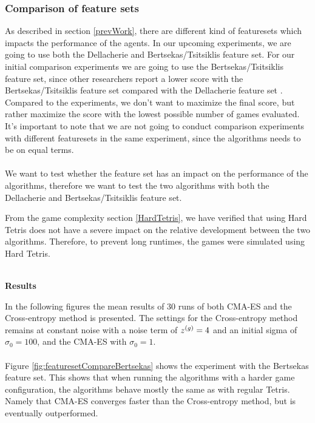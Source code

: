 \subsubsection{Comparison of feature sets  \label{compoffeatureset}}
As described in section \ref{prevWork}, there are different kind of featuresets which
impacts the performance of the agents. In our upcoming experiments, we are going to
use both the Dellacherie and Bertsekas/Tsitsiklis feature set. For our initial comparison experiments
we are going to use the Bertsekas/Tsitsiklis feature set, since other researchers report
a lower score with the Bertsekas/Tsitsiklis feature set compared with the Dellacherie feature set
\citep{thiery:09}. Compared to the \citep{thiery:09} experiments, we don't want to maximize the
final score, but rather maximize the score with the lowest possible number of 
games evaluated.\\
It's important to note that we are not going to conduct comparison experiments with different
featuresets in the same experiment, since the algorithms needs to be on equal terms.\\
\\
We want to test whether the feature set has an impact on the performance of the algorithms,
therefore we want to test the two algorithms with both the Dellacherie and Bertsekas/Tsitsiklis feature set.\\
\begin{changebar}
From the game complexity section \ref{HardTetris}, we have verified that using Hard Tetris
\citep{boumaza2009} does not have a severe impact on the relative 
development between the two algorithms.
Therefore, to prevent long runtimes, the games were simulated
using Hard Tetris.
\end{changebar}\\

\textbf{Results}

In the following figures the mean results of 30 runs of both CMA-ES and the Cross-entropy method is presented. The settings for the Cross-entropy method remains at constant noise
with a noise term of $z^{(g)} = 4$ and an initial sigma of $\sigma_0 = 100$, 
and the CMA-ES with $\sigma_0 = 1$.\\
\\
Figure \ref{fig:featuresetCompareBertsekas} shows the experiment with the 
Bertsekas feature set. This shows that when running the algorithms with a
harder game configuration, the algorithms behave mostly the same as with regular 
Tetris. Namely that CMA-ES converges faster than the Cross-entropy method, 
but is eventually outperformed.

